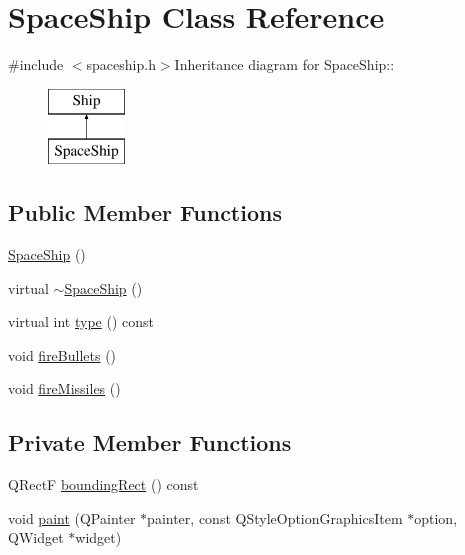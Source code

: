 \hypertarget{class_space_ship}{
\section{SpaceShip Class Reference}
\label{class_space_ship}
}


{\ttfamily \#include $<$spaceship.h$>$}Inheritance diagram for SpaceShip::\begin{figure}[H]
\begin{center}
\leavevmode
\includegraphics[height=2cm]{class_space_ship}
\end{center}
\end{figure}
\subsection*{Public Member Functions}
\begin{DoxyCompactItemize}
\item 
\hyperlink{class_space_ship_ae56e545157e761155089250245ad3455}{SpaceShip} ()
\item 
virtual \hyperlink{class_space_ship_a4442daaa9cdc06a0ff885aedabf8abf0}{$\sim$SpaceShip} ()
\item 
virtual int \hyperlink{class_space_ship_a4231df9fa04a8b82d07f62401000c1b7}{type} () const 
\item 
void \hyperlink{class_space_ship_ac941a05362258554baff929244c9e9f7}{fireBullets} ()
\item 
void \hyperlink{class_space_ship_a4fdfbd1a59a02df5897c2b37a49337c0}{fireMissiles} ()
\end{DoxyCompactItemize}
\subsection*{Private Member Functions}
\begin{DoxyCompactItemize}
\item 
QRectF \hyperlink{class_space_ship_a209b405c57298a7fd22edcf609d9ab36}{boundingRect} () const 
\item 
void \hyperlink{class_space_ship_adfc89b9201d546c24ca0bd7b59b44d24}{paint} (QPainter $\ast$painter, const QStyleOptionGraphicsItem $\ast$option, QWidget $\ast$widget)
\end{DoxyCompactItemize}
